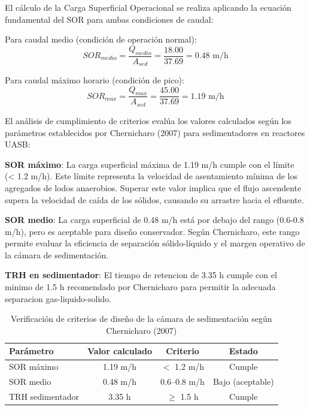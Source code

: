 El cálculo de la Carga Superficial Operacional se realiza aplicando la ecuación fundamental del SOR para ambas condiciones de caudal:

Para caudal medio (condición de operación normal):
\begin{equation}
SOR_{medio} = \frac{Q_{medio}}{A_{sed}} = \frac{18.00}{37.69} = 0.48 \text{ m/h}
\end{equation}

Para caudal máximo horario (condición de pico):
\begin{equation}
SOR_{max} = \frac{Q_{max}}{A_{sed}} = \frac{45.00}{37.69} = 1.19 \text{ m/h}
\end{equation}

El análisis de cumplimiento de criterios evalúa los valores calculados según los parámetros establecidos por Chernicharo (2007) para sedimentadores en reactores UASB:


     \textbf{SOR máximo}: La carga superficial máxima de 1.19 m/h cumple con el límite (< 1.2 m/h). Este límite representa la velocidad de asentamiento mínima de los agregados de lodos anaerobios. Superar este valor implica que el flujo ascendente supera la velocidad de caída de los sólidos, causando su arrastre hacia el efluente.
    
     \textbf{SOR medio}: La carga superficial de 0.48 m/h está por debajo del rango (0.6-0.8 m/h), pero es aceptable para diseño conservador. Según Chernicharo, este rango permite evaluar la eficiencia de separación sólido-líquido y el margen operativo de la cámara de sedimentación.
    
     \textbf{TRH en sedimentador}: El tiempo de retencion de 3.35 h cumple con el minimo de 1.5 h recomendado por Chernicharo para permitir la adecuada separacion gas-liquido-solido.


\begin{table}[H]
\centering
\caption{Verificación de criterios de diseño de la cámara de sedimentación según Chernicharo (2007)}
\begin{tabular}{lccc}
\toprule
\textbf{Parámetro} & \textbf{Valor calculado} & \textbf{Criterio} & \textbf{Estado} \\
\midrule
SOR máximo & 1.19 m/h & $<$ 1.2 m/h & Cumple \\
SOR medio & 0.48 m/h & 0.6--0.8 m/h & Bajo (aceptable) \\
TRH sedimentador & 3.35 h & $\geq$ 1.5 h & Cumple \\
\bottomrule
\end{tabular}
\end{table}


